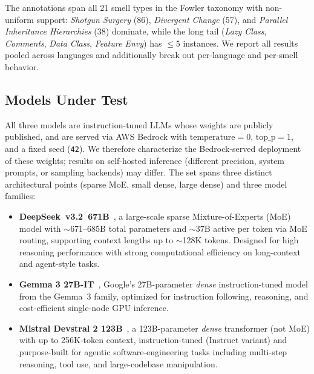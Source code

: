 \documentclass[conference]{IEEEtran}
\begin{document}
The annotations span all 21 smell types in the Fowler taxonomy with non-uniform
support: \textit{Shotgun Surgery} (86), \textit{Divergent Change} (57), and
\textit{Parallel Inheritance Hierarchies} (38) dominate, while the long tail
(\textit{Lazy Class}, \textit{Comments}, \textit{Data Class},
\textit{Feature Envy}) has $\le 5$ instances. We report all results pooled across
languages and additionally break out per-language and per-smell behavior.

\subsection{Models Under Test}
All three models are instruction-tuned LLMs whose weights are publicly
published, and are served via AWS Bedrock with
$\text{temperature}{=}0$, $\text{top\_p}{=}1$, and a fixed seed (\texttt{42}).
We therefore characterize the Bedrock-served deployment of these weights;
results on self-hosted inference (different precision, system prompts, or
sampling backends) may differ. The set spans three distinct architectural
points (sparse MoE, small dense, large dense) and three model families:
\begin{itemize}
 \item \textbf{DeepSeek~v3.2~671B}~\cite{deepseekai2024v3}, a large-scale sparse Mixture-of-Experts
 (MoE) model with $\sim$671--685B total parameters and $\sim$37B active per
 token via MoE routing, supporting context lengths up to $\sim$128K tokens.
 Designed for high reasoning performance with strong computational efficiency
 on long-context and agent-style tasks.
 \item \textbf{Gemma 3 27B-IT}~\cite{gemma3team2025}, Google's 27B-parameter \emph{dense}
 instruction-tuned model from the Gemma~3 family, optimized for instruction
 following, reasoning, and cost-efficient single-node GPU inference.
 \item \textbf{Mistral Devstral 2 123B}~\cite{jiang2023mistral}, a 123B-parameter \emph{dense}
 transformer (not MoE) with up to 256K-token context, instruction-tuned
 (Instruct variant) and purpose-built for agentic software-engineering
 tasks including multi-step reasoning, tool use, and large-codebase
 manipulation.
\end{itemize}
\end{document}
